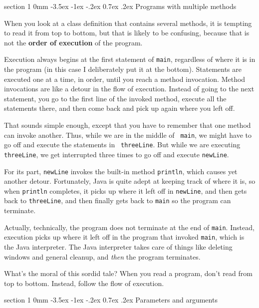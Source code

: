 \documentclass{book}
\makeatletter
\renewcommand{\section}{\@startsection 
    {section} {1} {0mm}%
    {-3.5ex \@plus -1ex \@minus -.2ex}%
    {0.7ex \@plus.2ex}%
    {\normalfont\Large\bfseries}}
\makeatother
\begin{document}
\section {Programs with multiple methods}

When you look at a class definition that contains several methods, it
is tempting to read it from top to bottom, but that is likely to be
confusing, because that is not the {\bf order of execution} of the
program.

Execution always begins at the first statement of {\tt main},
regardless of where it is in the program (in this case I deliberately
put it at the bottom).  Statements are executed one at a time, in
order, until you reach a method invocation.  Method invocations are
like a detour in the flow of execution.  Instead of going to the next
statement, you go to the first line of the invoked method, execute all
the statements there, and then come back and pick up again where you
left off.

That sounds simple enough, except that you have to remember that one
method can invoke another.  Thus, while we are in the middle of {\tt
main}, we might have to go off and execute the statements in {\tt
threeLine}.  But while we are executing {\tt threeLine}, we get
interrupted three times to go off and execute {\tt newLine}.

For its part, {\tt newLine} invokes the built-in method
{\tt println}, which causes yet another detour.  Fortunately,
Java is quite adept at keeping track of where it is, so when
{\tt println} completes, it picks up where it left off in
{\tt newLine}, and then gets back to {\tt threeLine}, and then
finally gets back to {\tt main} so the program can terminate.

Actually, technically, the program does not terminate at the
end of {\tt main}.  Instead, execution picks up where it left
off in the program that invoked {\tt main}, which is the
Java interpreter.  The Java interpreter takes care of things
like deleting windows and general cleanup, and {\em then}
the program terminates.

What's the moral of this sordid tale?  When you
read a program, don't read from top to bottom.  Instead,
follow the flow of execution.

\section {Parameters and arguments}
\end{document}
